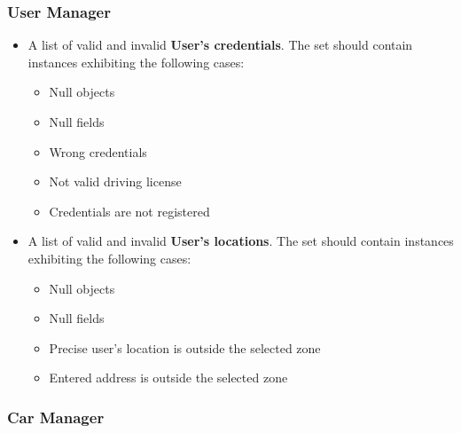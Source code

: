 		\subsubsection{User Manager}
		
		\begin{itemize}
			\item A list of valid and invalid \textbf{User's credentials}. The set should contain instances exhibiting the following cases:
				
				\begin{itemize}
					\item Null objects
					\item Null fields
					\item Wrong credentials
					\item Not valid driving license
					\item Credentials are not registered
				\end{itemize}
				
			\item A list of valid and invalid \textbf{User's locations}. The set should contain instances exhibiting the following cases:	
				\begin{itemize}
					\item Null objects
					\item Null fields
					\item Precise user's location is outside the selected zone
					\item Entered address is outside the selected zone  
				\end{itemize}
				
		\end{itemize}
		
		\subsubsection{Car Manager}
		

